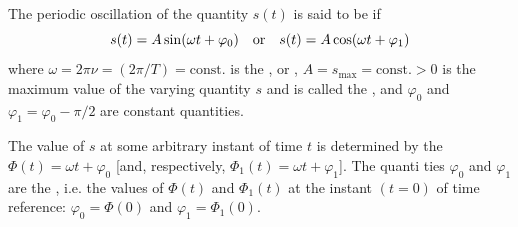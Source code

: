The periodic oscillation of the quantity $s (t)$ is said to be  if
\begin{equation*}%
s (t) = A \sin ( \omega t + \varphi_{0}) \qor s (t) = A \cos (\omega t + \varphi_{1})
\end{equation*}
where $\omega = 2\pi \nu = (2\pi/T) = \text{const.}$ is the , or , $A = s_{\textrm{max}} = \text{const.} > 0$ is the maximum value of the varying quantity $s$ and is called the , and $\varphi_{0}$ and $\varphi_{1} = \varphi_{0} - \pi/2$ are constant quantities. 

The value of $s$ at some arbitrary instant of time $t$ is determined by the   $\Phi(t) = \omega t  + \varphi_{0}$ [and, respectively, $\Phi_{1}(t) = \omega t  + \varphi_{1}$]. The quanti­ ties $\varphi_{0}$ and $\varphi_{1}$ are the , i.e. the values of $\Phi(t)$ and   $\Phi_{1}(t)$ at the instant $(t = 0)$ of time reference: $\varphi_{0} =  \Phi(0)$ and $\varphi_{1} =   \Phi_{1}(0)$.

